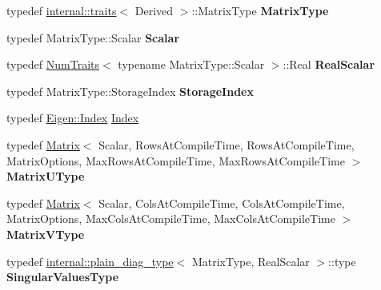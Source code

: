 \begin{DoxyCompactItemize}
typedef \hyperlink{struct_eigen_1_1internal_1_1traits}{internal\+::traits}$<$ Derived $>$\+::Matrix\+Type {\bfseries Matrix\+Type}
\item 
\mbox{\label{group___s_v_d___module_a9ac59dd357f42051be947ca7c4a23745}} 
typedef Matrix\+Type\+::\+Scalar {\bfseries Scalar}
\item 
\mbox{\label{group___s_v_d___module_a57f51134f3084c5b9998298569495920}} 
typedef \hyperlink{group___core___module_struct_eigen_1_1_num_traits}{Num\+Traits}$<$ typename Matrix\+Type\+::\+Scalar $>$\+::Real {\bfseries Real\+Scalar}
\item 
\mbox{\label{group___s_v_d___module_a98b3202ef30648952815e77338408f27}} 
typedef Matrix\+Type\+::\+Storage\+Index {\bfseries Storage\+Index}
\item 
typedef \hyperlink{namespace_eigen_a62e77e0933482dafde8fe197d9a2cfde}{Eigen\+::\+Index} \hyperlink{group___s_v_d___module_a6229a37997eca1072b52cca5ee7a2bec}{Index}
\item 
\mbox{\label{group___s_v_d___module_ab62c306c5d1efeae9bce88dee1b04965}} 
typedef \hyperlink{group___core___module_class_eigen_1_1_matrix}{Matrix}$<$ Scalar, Rows\+At\+Compile\+Time, Rows\+At\+Compile\+Time, Matrix\+Options, Max\+Rows\+At\+Compile\+Time, Max\+Rows\+At\+Compile\+Time $>$ {\bfseries Matrix\+U\+Type}
\item 
\mbox{\label{group___s_v_d___module_af2ec05d33dd5be28df6fcf56346e23ec}} 
typedef \hyperlink{group___core___module_class_eigen_1_1_matrix}{Matrix}$<$ Scalar, Cols\+At\+Compile\+Time, Cols\+At\+Compile\+Time, Matrix\+Options, Max\+Cols\+At\+Compile\+Time, Max\+Cols\+At\+Compile\+Time $>$ {\bfseries Matrix\+V\+Type}
\item 
\mbox{\label{group___s_v_d___module_a7426695e87c152fbb8bc7834dd8e6ce3}} 
typedef \hyperlink{struct_eigen_1_1internal_1_1plain__diag__type}{internal\+::plain\+\_\+diag\+\_\+type}$<$ Matrix\+Type, Real\+Scalar $>$\+::type {\bfseries Singular\+Values\+Type}
\item 
\mbox{\label{group___s_v_d___module_aee6fbe51774ff57b8446f0b14a4f34ac}} 

\end{DoxyCompactItemize}
